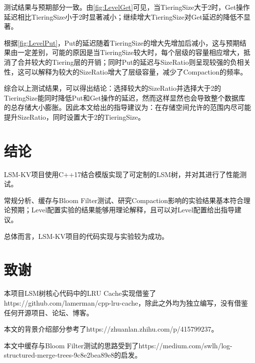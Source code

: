 \documentclass[a4paper,UTF8]{ctexart}
\begin{document}
\par
测试结果与预期部分一致。由\autoref{fig:LevelGet}可见，当TieringSize大于2时，Get操作延迟相比TieringSize小于2时显著减小；继续增大TieringSize对Get延迟的降低不显著。
\par
根据\autoref{fig:LevelPut}，Put的延迟随着TieringSize的增大先增加后减小，这与预期结果由一定差别，可能的原因是当TieringSize较大时，每个层级的容量相应增大，抵消了合并较大的Tiering层的开销；同时Put的延迟与SizeRatio则呈现较强的负相关性，这可以解释为较大的SizeRatio增大了层级容量，减少了Compaction的频率。
\par
综合以上测试结果，可以得出结论：选择较大的SizeRatio并选择大于2的TieringSize能同时降低Put和Get操作的延迟，然而这样显然也会导致整个数据库的总存储大小膨胀。因此本文给出的指导建议为：在存储空间允许的范围内尽可能提升SizeRatio，同时设置大于2的TieringSize。


\section{结论}
LSM-KV项目使用C++17结合模版实现了可定制的LSM树，并对其进行了性能测试。
\par
常规分析、缓存与Bloom Filter测试、研究Compaction影响的实验结果基本符合理论预期；Level配置实验的结果能够用理论解释，且可以对Level配置给出指导建议。
\par
总体而言，LSM-KV项目的代码实现与实验较为成功。

\section{致谢}
本项目LSM树核心代码中的LRU Cache实现借鉴了https://github.com/lamerman/cpp-lru-cache，除此之外均为独立编写，没有借鉴任何开源项目、论坛、博客。
\par
本文的背景介绍部分参考了https://zhuanlan.zhihu.com/p/415799237。
\par
本文中缓存与Bloom Filter测试的思路受到了https://medium.com/swlh/log-structured-merge-trees-9c8e2bea89e8的启发。
\end{document}
